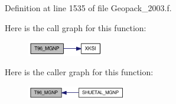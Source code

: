 Definition at line 1535 of file Geopack\_\-2003.f.

Here is the call graph for this function:\nopagebreak
\begin{figure}[H]
\begin{center}
\leavevmode
\includegraphics[width=94pt]{_geopack__2003_8f_eb78a92a9deaca0077c026b5adf32cad_cgraph}
\end{center}
\end{figure}


Here is the caller graph for this function:\nopagebreak
\begin{figure}[H]
\begin{center}
\leavevmode
\includegraphics[width=122pt]{_geopack__2003_8f_eb78a92a9deaca0077c026b5adf32cad_icgraph}
\end{center}
\end{figure}
